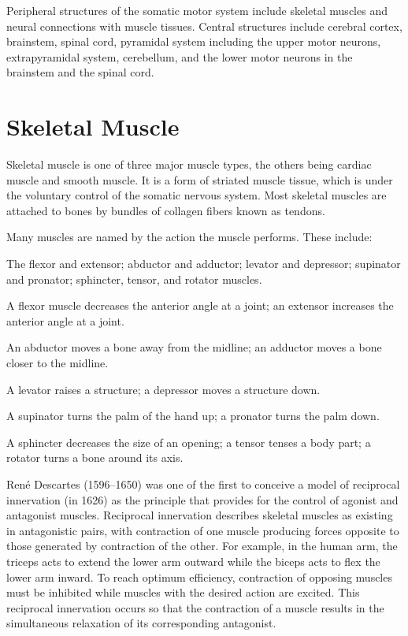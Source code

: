 Peripheral structures of the somatic motor system include skeletal muscles and neural connections with muscle tissues. Central structures include cerebral cortex, brainstem, spinal cord, pyramidal system including the upper motor neurons, extrapyramidal system, cerebellum, and the lower motor neurons in the brainstem and the spinal cord.

\hypertarget{skeletal-muscle}{%
\section{Skeletal Muscle}\label{skeletal-muscle}}

Skeletal muscle is one of three major muscle types, the others being cardiac muscle and smooth muscle. It is a form of striated muscle tissue, which is under the voluntary control of the somatic nervous system. Most skeletal muscles are attached to bones by bundles of collagen fibers known as tendons.

Many muscles are named by the action the muscle performs. These include:

The flexor and extensor; abductor and adductor; levator and depressor; supinator and pronator; sphincter, tensor, and rotator muscles.

A flexor muscle decreases the anterior angle at a joint; an extensor increases the anterior angle at a joint.

An abductor moves a bone away from the midline; an adductor moves a bone closer to the midline.

A levator raises a structure; a depressor moves a structure down.

A supinator turns the palm of the hand up; a pronator turns the palm down.

A sphincter decreases the size of an opening; a tensor tenses a body part; a rotator turns a bone around its axis.

René Descartes (1596--1650) was one of the first to conceive a model of reciprocal innervation (in 1626) as the principle that provides for the control of agonist and antagonist muscles. Reciprocal innervation describes skeletal muscles as existing in antagonistic pairs, with contraction of one muscle producing forces opposite to those generated by contraction of the other. For example, in the human arm, the triceps acts to extend the lower arm outward while the biceps acts to flex the lower arm inward. To reach optimum efficiency, contraction of opposing muscles must be inhibited while muscles with the desired action are excited. This reciprocal innervation occurs so that the contraction of a muscle results in the simultaneous relaxation of its corresponding antagonist.

